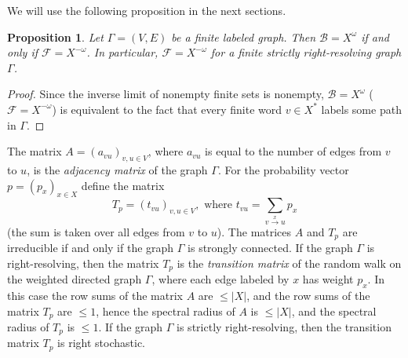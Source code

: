 \documentclass[12pt]{article}
\newcommand{\xmo}{X^{-\omega}}
\newcommand{\xo}{X^\omega}
\newcommand{\gr}{\Gamma}
\newcommand{\B}{\mathscr{B}}
\newcommand{\F}{\mathscr{F}}
\newtheorem{prop}[theor]{Proposition}
\theoremstyle{definition}
\begin{document}
We will use the following proposition in the next sections.
\begin{prop}\label{prop cup B_v eq cup F_v}
Let $\gr=(V,E)$ be a finite labeled graph. Then $\B=\xo$ if and only if $\F=\xmo$. In particular,
$\F=\xmo$ for a finite strictly right-resolving graph $\gr$.
\end{prop}
\begin{proof}
Since the inverse limit of nonempty finite sets is nonempty, $\B=\xo$ ($\F=\xmo$) is equivalent to
the fact that every finite word $v\in{X^*}$ labels some path in $\gr$.
\end{proof}



The matrix $A=(a_{vu})_{v,u\in V}$, where $a_{vu}$ is equal to the number of edges from $v$ to $u$,
is the \textit{adjacency matrix} of the graph $\gr$. For the probability vector $p=(p_x)_{x\in X}$
define the matrix
\[
T_p=(t_{vu})_{v,u\in V}, \mbox{ where } t_{vu}=\sum\limits_{v\stackrel{x}\rightarrow u}p_x
\]
(the sum is taken over all edges from $v$ to $u$). The matrices $A$ and $T_p$ are irreducible if
and only if the graph $\gr$ is strongly connected. If the graph $\gr$ is right-resolving, then the
matrix $T_p$ is the \textit{transition matrix} of the random walk on the weighted directed graph
$\gr$, where each edge labeled by $x$ has weight $p_x$. In this case the row sums of the matrix $A$
are $\leq |X|$, and the row sums of the matrix $T_p$ are $\leq 1$, hence the spectral radius of $A$
is $\leq |X|$, and the spectral radius of $T_p$ is $\leq 1$. If the graph $\gr$ is strictly
right-resolving, then the transition matrix $T_p$ is right stochastic.
\end{document}
